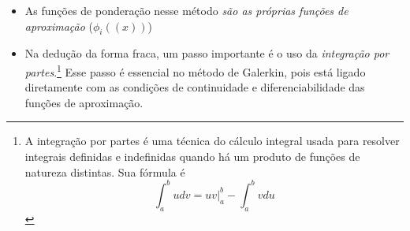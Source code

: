 \documentclass[a4paper, 12pt]{article}
\numberwithin{equation}{section}
\begin{document}
\begin{itemize}
    \item As funções de ponderação nesse método \textit{são as próprias funções de aproximação} ($\phi_{i}((x))$)
    \item Na dedução da forma fraca, um passo importante é  o uso da \textit{integração por partes}.\footnote{A integração por 
    partes é uma técnica do cálculo integral usada para resolver integrais definidas e indefinidas quando há um produto 
    de funções de natureza distintas. Sua fórmula é  
    \begin{equation*}
    \int_{a}^{b} u dv = uv\big|_{a}^{b} - \int_{a}^{b} v du
    \end{equation*}
        }
    Esse passo é essencial no método de Galerkin, pois está ligado diretamente com as condições de continuidade e 
    diferenciabilidade das funções de aproximação.
\end{itemize}















\newpage 


\end{document}
